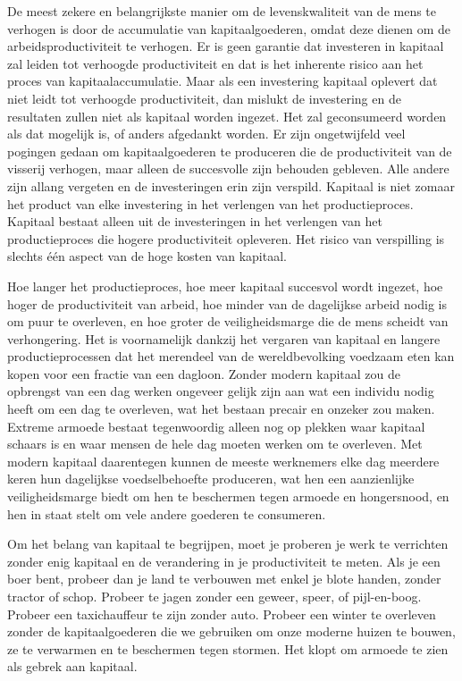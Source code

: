 \documentclass[
  a5paper,
  smalldemyvopaper,11pt,twoside,onecolumn,openright,extrafontsizes,
hidelinks]{memoir}
\begin{document}
De meest zekere en belangrijkste manier om de levenskwaliteit van de
mens te verhogen is door de accumulatie van kapitaalgoederen, omdat deze
dienen om de arbeidsproductiviteit te verhogen. Er is geen garantie dat
investeren in kapitaal zal leiden tot verhoogde productiviteit en dat is
het inherente risico aan het proces van kapitaalaccumulatie. Maar als
een investering kapitaal oplevert dat niet leidt tot verhoogde
productiviteit, dan mislukt de investering en de resultaten zullen niet
als kapitaal worden ingezet. Het zal geconsumeerd worden als dat
mogelijk is, of anders afgedankt worden. Er zijn ongetwijfeld veel
pogingen gedaan om kapitaalgoederen te produceren die de productiviteit
van de visserij verhogen, maar alleen de succesvolle zijn behouden
gebleven. Alle andere zijn allang vergeten en de investeringen erin zijn
verspild. Kapitaal is niet zomaar het product van elke investering in
het verlengen van het productieproces. Kapitaal bestaat alleen uit de
investeringen in het verlengen van het productieproces die hogere
productiviteit opleveren. Het risico van verspilling is slechts één
aspect van de hoge kosten van kapitaal.

Hoe langer het productieproces, hoe meer kapitaal succesvol wordt
ingezet, hoe hoger de productiviteit van arbeid, hoe minder van de
dagelijkse arbeid nodig is om puur te overleven, en hoe groter de
veiligheidsmarge die de mens scheidt van verhongering. Het is
voornamelijk dankzij het vergaren van kapitaal en langere
productieprocessen dat het merendeel van de wereldbevolking voedzaam
eten kan kopen voor een fractie van een dagloon. Zonder modern kapitaal
zou de opbrengst van een dag werken ongeveer gelijk zijn aan wat een
individu nodig heeft om een dag te overleven, wat het bestaan precair en
onzeker zou maken. Extreme armoede bestaat tegenwoordig alleen nog op
plekken waar kapitaal schaars is en waar mensen de hele dag moeten
werken om te overleven. Met modern kapitaal daarentegen kunnen de meeste
werknemers elke dag meerdere keren hun dagelijkse voedselbehoefte
produceren, wat hen een aanzienlijke veiligheidsmarge biedt om hen te
beschermen tegen armoede en hongersnood, en hen in staat stelt om vele
andere goederen te consumeren.

Om het belang van kapitaal te begrijpen, moet je proberen je werk te
verrichten zonder enig kapitaal en de verandering in je productiviteit
te meten. Als je een boer bent, probeer dan je land te verbouwen met
enkel je blote handen, zonder tractor of schop. Probeer te jagen zonder
een geweer, speer, of pijl-en-boog. Probeer een taxichauffeur te zijn
zonder auto. Probeer een winter te overleven zonder de kapitaalgoederen
die we gebruiken om onze moderne huizen te bouwen, ze te verwarmen en te
beschermen tegen stormen. Het klopt om armoede te zien als gebrek aan
kapitaal.
\end{document}

